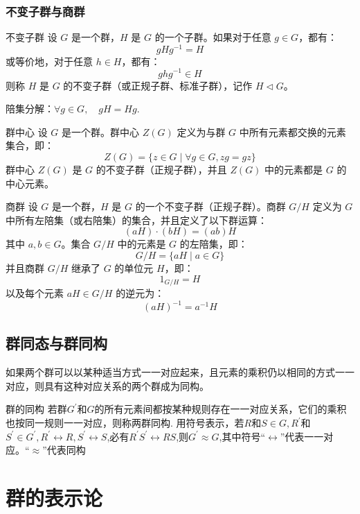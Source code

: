 \documentclass[12pt, openany]{ctexbook} %
\numberwithin{equation}{section} %
\begin{document}
\subsection{不变子群与商群}

\begin{mydef}{不变子群}
  设 \( G \) 是一个群，\( H \) 是 \( G \) 的一个子群。如果对于任意 \( g \in G \)，都有：
  \[
  gHg^{-1} = H
  \]
  或等价地，对于任意 \( h \in H \)，都有：
  \[
  ghg^{-1} \in H
  \]
  则称 \( H \) 是 \( G \) 的不变子群（或正规子群、标准子群），记作 \( H \triangleleft G \)。
  \end{mydef}

陪集分解：$
   \forall g \in G, \quad gH = Hg.
   $

\begin{mydef}{群中心}
    设 \( G \) 是一个群。群中心 \( Z(G) \) 定义为与群 \( G \) 中所有元素都交换的元素集合，即：
    \[
    Z(G) = \{ z \in G \mid \forall g \in G, zg = gz \}
    \]
    群中心 \( Z(G) \) 是 \( G \) 的不变子群（正规子群），并且 \( Z(G) \) 中的元素都是 \( G \) 的中心元素。
    \end{mydef}


    \begin{mydef}{商群}
      设 \( G \) 是一个群，\( H \) 是 \( G \) 的一个不变子群（正规子群）。商群 \( G/H \) 定义为 \( G \) 中所有左陪集（或右陪集）的集合，并且定义了以下群运算：
      \[
      (aH) \cdot (bH) = (ab)H
      \]
      其中 \( a, b \in G \)。集合 \( G/H \) 中的元素是 \( G \) 的左陪集，即：
      \[
      G/H = \{ aH \mid a \in G \}
      \]
      并且商群 \( G/H \) 继承了 \( G \) 的单位元 \( H \)，即：
      \[
      1_{G/H} = H
      \]
      以及每个元素 \( aH \in G/H \) 的逆元为：
      \[
      (aH)^{-1} = a^{-1}H
      \]
      \end{mydef}

\section{群同态与群同构}


如果两个群可以以某种适当方式一一对应起来，且元素的乘积仍以相同的方式一一对应，则具有这种对应关系的两个群成为同构。
\begin{mydef}{群的同构}
  若群$G^\prime$和$G$的所有元素间都按某种规则存在一一对应关系，它们的乘积也按同一规则一一对应，则称两群同构. 用符号表示，若$R$和$S\in G,R^\prime$和$S^{\prime}\in G^{\prime},R^{\prime}\longleftrightarrow R,S^{\prime}\longleftrightarrow S$,必有$R^\prime S^{\prime}\longleftrightarrow RS$,则$G^\prime\approx G$,其中符号“$\longleftrightarrow$”代表一一对应。“$\approx”代表同构$
 \end{mydef}






\chapter{群的表示论}
\end{document}

